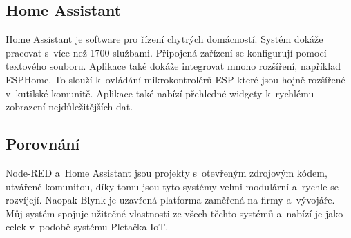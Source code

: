 \subsection{Home Assistant}
Home Assistant je software pro řízení chytrých domácností. 
Systém dokáže pracovat s~více než 1700 službami.
Připojená zařízení se konfigurují pomocí textového souboru.
Aplikace také dokáže integrovat mnoho rozšíření, například ESPHome.
To slouží k~ovládání mikrokontrolérů ESP které jsou hojně rozšířené v~kutilské komunitě.
Aplikace také nabízí přehledné widgety k~rychlému zobrazení nejdůležitějších dat. 


\subsection{Porovnání}
Node-RED a~Home Assistant jsou projekty s~otevřeným zdrojovým kódem, utvářené komunitou, díky tomu jsou tyto systémy velmi modulární a~rychle se rozvíjejí. %
Naopak Blynk je uzavřená platforma zaměřená na firmy a~vývojáře.
Můj systém spojuje užitečné vlastnosti ze všech těchto systémů a~nabízí je jako celek v~podobě systému Pletačka IoT.

